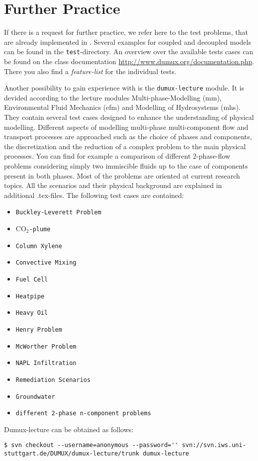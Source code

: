 \section{Further Practice}
\label{tutorial-furtherpractice}

If there is a request for further practice, we refer here to the test problems, that
are already implemented in \Dumux. Several examples for coupled and decoupled models
can be found in the \texttt{test}-directory. An overview over the available tests
cases can be found on the class documentation \url{http://www.dumux.org/documentation.php}.
There you also find a \emph{feature-list} for the individual tests.

Another possibility to gain experience with \Dumux is the \texttt{dumux-lecture} module. It is devided according to
the lecture modules Multi-phase-Modelling (mm), Environmental Fluid Mechanics (efm) and Modelling of Hydrosystems (mhs). 
They contain several test cases designed to enhance the understanding of physical modelling. 
Different aspects of modelling multi-phase multi-component flow and transport processes are approached such as the 
choice of phases and components, the discretization and the reduction of a complex problem to the main physical 
processes. You can find for example a comparison of different 2-phase-flow problems considering simply two immiscible 
fluids up to the case of components present in both phases. Most of the problems are oriented at current research topics.
All the scenarios and their physical background are explained in additional .tex-files. The following test cases are 
contained:
\begin{itemize}
\item \texttt{Buckley-Leverett Problem}
\item \texttt{$\text{CO}_2$-plume}
\item \texttt{Column Xylene}
\item \texttt{Convective Mixing}
\item \texttt{Fuel Cell}
\item \texttt{Heatpipe}
\item \texttt{Heavy Oil}
\item \texttt{Henry Problem}
\item \texttt{McWorther Problem}
\item \texttt{NAPL Infiltration}
\item \texttt{Remediation Scenarios}
\item \texttt{Groundwater}
\item \texttt{different 2-phase n-component problems}
\end{itemize}

Dumux-lecture can be obtained as follows:
\begin{lstlisting}[style=Bash]
$ svn checkout --username=anonymous --password='' svn://svn.iws.uni-stuttgart.de/DUMUX/dumux-lecture/trunk dumux-lecture
\end{lstlisting}
